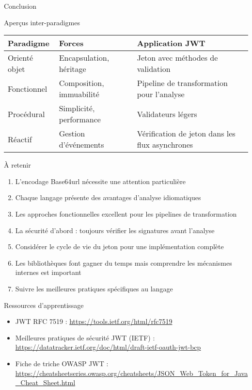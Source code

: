 \documentclass[presentation,aspectratio=169]{beamer}
\begin{document}
\begin{frame}[label={sec:orgc6c3753},fragile]{Conclusion}
 \begin{block}{Aperçus inter-paradigmes}
\begin{center}
\begin{tabular}{lll}
Paradigme & Forces & Application JWT\\
\hline
Orienté objet & Encapsulation, héritage & Jeton avec méthodes de validation\\
Fonctionnel & Composition, immuabilité & Pipeline de transformation pour l'analyse\\
Procédural & Simplicité, performance & Validateurs légers\\
Réactif & Gestion d'événements & Vérification de jeton dans les flux asynchrones\\
\end{tabular}
\end{center}
\end{block}
\begin{block}{À retenir}
\begin{enumerate}[<+->]
\item L'encodage Base64url nécessite une attention particulière
\item Chaque langage présente des avantages d'analyse idiomatiques
\item Les approches fonctionnelles excellent pour les pipelines de transformation
\item La sécurité d'abord : toujours vérifier les signatures avant l'analyse
\item Considérer le cycle de vie du jeton pour une implémentation complète
\item Les bibliothèques font gagner du temps mais comprendre les mécanismes internes est important
\item Suivre les meilleures pratiques spécifiques au langage
\end{enumerate}
\end{block}
\begin{block}{Ressources d'apprentissage}
\begin{itemize}[<+->]
\item JWT RFC 7519 : \url{https://tools.ietf.org/html/rfc7519}
\item Meilleures pratiques de sécurité JWT (IETF) : \url{https://datatracker.ietf.org/doc/html/draft-ietf-oauth-jwt-bcp}
\item Fiche de triche OWASP JWT : \url{https://cheatsheetseries.owasp.org/cheatsheets/JSON\_Web\_Token\_for\_Java\_Cheat\_Sheet.html}

\end{itemize}
\end{block}
\end{frame}
\end{document}
